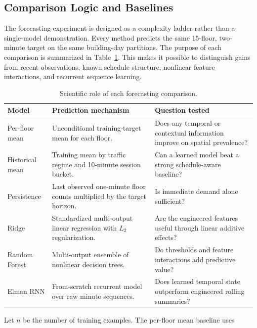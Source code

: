 \documentclass[12pt]{article}
\begin{document}
\subsection{Comparison Logic and Baselines}

The forecasting experiment is designed as a complexity ladder rather than a
single-model demonstration. Every method predicts the same 15-floor,
two-minute target on the same building-day partitions. The purpose of each
comparison is summarized in Table~\ref{tab:forecaster-roles}. This makes it
possible to distinguish gains from recent observations, known schedule
structure, nonlinear feature interactions, and recurrent sequence learning.

\begin{table}[H]
  \centering
  \caption{Scientific role of each forecasting comparison.}
  \label{tab:forecaster-roles}
  \begin{tabular}{@{}>{\raggedright\arraybackslash}p{}
    >{\raggedright\arraybackslash}p{}
    >{\raggedright\arraybackslash}p{}@{}}
    \toprule
    Model & Prediction mechanism & Question tested \\
    \midrule
    Per-floor mean & Unconditional training-target mean for each floor. & Does
      any temporal or contextual information improve on spatial prevalence? \\
    Historical mean & Training mean by traffic regime and 10-minute session
      bucket. & Can a learned model beat a strong schedule-aware baseline? \\
    Persistence & Last observed one-minute floor counts multiplied by the
      target horizon. & Is immediate demand alone sufficient? \\
    Ridge & Standardized multi-output linear regression with $L_2$
      regularization. & Are the engineered features useful through linear
      additive effects? \\
    Random Forest & Multi-output ensemble of nonlinear decision trees. & Do
      thresholds and feature interactions add predictive value? \\
    Elman RNN & From-scratch recurrent model over raw minute sequences. & Does
      learned temporal state outperform engineered rolling summaries? \\
    \bottomrule
  \end{tabular}
\end{table}

Let $n$ be the number of training examples. The per-floor mean baseline uses
\end{document}

